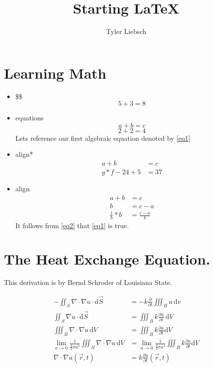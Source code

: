 \documentclass[12pt]{article}
\title{Starting LaTeX}
\author{Tyler Liebsch}
\newcommand{\td}{\text{d}}
\begin{document}
\linespread{1.4}
\oddsidemargin=15pt
\maketitle

\section{Learning Math}

\begin{itemize}
\item \$\$
  $$
     5+3=8
  $$

\item equations
  \begin{equation}
    a+b=c
    \label{eq1}
  \end{equation}
  \begin{equation}
  2+2=4
  \end{equation}
Lets reference our first algebraic equation denoted by \eqref{eq1}

\item align*
    \begin{align*}
    a+b & =c \\
    g*f-24+5 & = 37
    \end{align*}
\item{align}
   \begin{align}
   \nonumber
   a+b & = c \\
   \nonumber
   b & = c-a \\
  \label{eq2}
   \frac{1}{b}*{b} & = \frac{c-a}{b}
   \end{align}
It follows from \eqref{eq2} that \eqref{eq1} is true.
\end{itemize}

\newpage

\section{The Heat Exchange Equation.}
This derivation is by Bernd Schr\*oder of Louisiana State.

\begin{align}
    -\iint_S\nabla \cdot \nabla u \cdot \text{d}\vec{S}
    & = -k \frac{\partial}{\partial t} \iiint_B u \, \text{d}v \\
    \iint_S \nabla u \cdot \td \vec{S}
    & = \iiint_B k \frac{\partial u}{\partial t} \, \td V \\
    \iiint_B \nabla \cdot \nabla u \, \td V & = \iiint_B k \frac{\partial u}{\partial t} \td V \\
    \lim_{a \rightarrow 0}\frac{1}{ \frac{4}{3} \pi a^3} \iiint_B \nabla \cdot \nabla u \, \td V  
    &= \lim_{a \rightarrow 0}\frac{1}{ \frac{4}{3} \pi a^3} \iiint_B k \frac{\partial u}{\partial t} \td V \\
    \nabla \cdot \nabla u( \vec{r},t) &= k \frac{\partial u}{\partial t}(\vec{r}, t)
\end{align}
\end{document}
